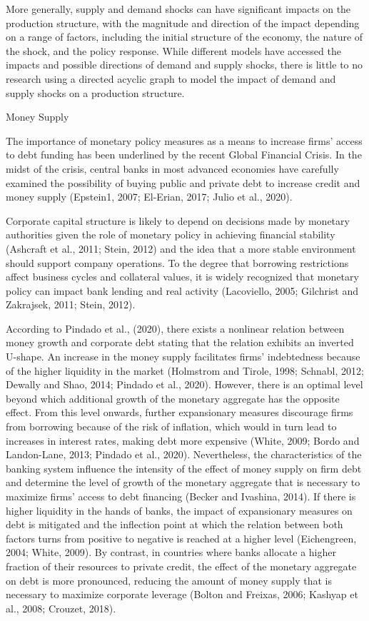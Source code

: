 \documentclass[11pt]{article}
\begin{document}
More generally, supply and demand shocks can have significant impacts on
the production structure, with the magnitude and direction of the impact
depending on a range of factors, including the initial structure of the
economy, the nature of the shock, and the policy response. While
different models have accessed the impacts and possible directions of
demand and supply shocks, there is little to no research using a
directed acyclic graph to model the impact of demand and supply shocks
on a production structure.

Money Supply

The importance of monetary policy measures as a means to increase firms'
access to debt funding has been underlined by the recent Global
Financial Crisis. In the midst of the crisis, central banks in most
advanced economies have carefully examined the possibility of buying
public and private debt to increase credit and money supply (Epstein1,
2007; El-Erian, 2017; Julio et al., 2020).

Corporate capital structure is likely to depend on decisions made by
monetary authorities given the role of monetary policy in achieving
financial stability (Ashcraft et al., 2011; Stein, 2012) and the idea
that a more stable environment should support company operations. To the
degree that borrowing restrictions affect business cycles and collateral
values, it is widely recognized that monetary policy can impact bank
lending and real activity (Lacoviello, 2005; Gilchrist and Zakrajsek,
2011; Stein, 2012).

According to Pindado et al., (2020), there exists a nonlinear relation
between money growth and corporate debt stating that the relation
exhibits an inverted U-shape. An increase in the money supply
facilitates firms' indebtedness because of the higher liquidity in the
market (Holmstrom and Tirole, 1998; Schnabl, 2012; Dewally and Shao,
2014; Pindado et al., 2020). However, there is an optimal level beyond
which additional growth of the monetary aggregate has the opposite
effect. From this level onwards, further expansionary measures
discourage firms from borrowing because of the risk of inflation, which
would in turn lead to increases in interest rates, making debt more
expensive (White, 2009; Bordo and Landon-Lane, 2013; Pindado et al.,
2020). Nevertheless, the characteristics of the banking system influence
the intensity of the effect of money supply on firm debt and determine
the level of growth of the monetary aggregate that is necessary to
maximize firms' access to debt financing (Becker and Ivashina, 2014). If
there is higher liquidity in the hands of banks, the impact of
expansionary measures on debt is mitigated and the inflection point at
which the relation between both factors turns from positive to negative
is reached at a higher level (Eichengreen, 2004; White, 2009). By
contrast, in countries where banks allocate a higher fraction of their
resources to private credit, the effect of the monetary aggregate on
debt is more pronounced, reducing the amount of money supply that is
necessary to maximize corporate leverage (Bolton and Freixas, 2006;
Kashyap et al., 2008; Crouzet, 2018).
\end{document}
